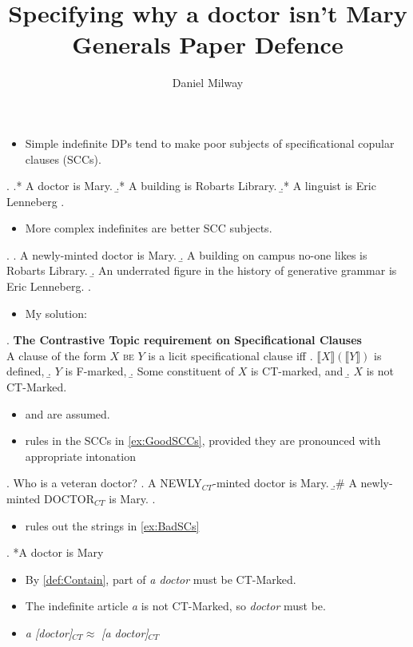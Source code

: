 \documentclass[letterpaper]{article}
\title{Specifying why a doctor isn't Mary\\
  Generals Paper Defence
}
\author{Daniel Milway}
\begin{document}
\maketitle
\begin{itemize}
  \item Simple indefinite DPs tend to make poor subjects of specificational copular clauses (SCCs).
\end{itemize}
\ex.\label{ex:BadSCs} 
\a.* A doctor is Mary.
\b.* A building is Robarts Library.
\b.* A linguist is Eric Lenneberg
\z.

\begin{itemize}
  \item More complex indefinites are better SCC subjects.
\end{itemize}
\ex.\label{ex:GoodSCCs}
\a. A newly-minted doctor is Mary.
\b. A building on campus no-one likes is Robarts Library.
\b. An underrated figure in the history of generative grammar is Eric Lenneberg.
\z.

\begin{itemize}
  \item My solution:
\end{itemize}
\ex.\label{def:CTCondition} \textbf{The Contrastive Topic requirement on Specificational Clauses}\\
A clause of the form $X$ \textsc{be} $Y$ is a licit specificational clause iff
\a. $\llbracket X\rrbracket(\llbracket Y\rrbracket)$ is defined,
\b. $Y$ is F-marked, \parencite{mikkelsen2004specifying}
\b.\label{def:Contain} Some constituent of $X$ is CT-marked, and
\b.\label{def:NotBe} $X$ is not CT-Marked.

\begin{itemize}
  \item \Last[a] and \Last[b] are assumed.
  \item \Last[c] rules in the SCCs in \ref{ex:GoodSCCs}, provided they are pronounced with appropriate intonation
\end{itemize}
\ex. Who is a veteran doctor?
\a. A NEWLY$_{CT}$-minted doctor is Mary.
\b.\# A newly-minted DOCTOR$_{CT}$ is Mary.
\z.

\begin{itemize}
  \item \LLast[d] rules out the strings in \ref{ex:BadSCs}
\end{itemize}
\ex. *A doctor is Mary

\begin{itemize}
  \item By \ref{def:Contain}, part of \textit{a doctor} must be CT-Marked.
  \item The indefinite article \textit{a} is not CT-Marked, so \textit{doctor} must be.
  \item \textit{a [doctor]}$_{CT} \approx$ \textit{[a doctor]}$_{CT}$
\end{itemize}
\end{document}
